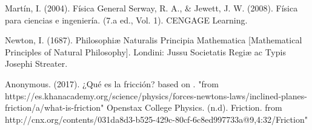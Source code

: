 \documentclass{article}
\begin{document}
\begin{thebibliography}{9}						%
		Martín, I. (2004). Física General
		Serway, R. A., $\&$ Jewett, J. W. (2008). Física para ciencias e ingeniería. (7.a
ed., Vol. 1). CENGAGE Learning.

	Newton, I. (1687). Philosophiæ Naturalis Principia Mathematica [Mathematical Principles of Natural Philosophy]. Londini: Jussu Societatis Regiæ ac Typis Josephi Streater.

	Anonymous. (2017). ¿Qué es la fricción? based on \cite{Openstax College Physics}. "from https://es.khanacademy.org/science/physics/forces-newtons-laws/inclined-planes-friction/a/what-is-friction"
		Openstax College Physics. (n.d). Friction. from http://cnx.org/contents/031da8d3-b525-429c-80cf-6c8ed997733a@9,4:32/Friction"

\end{thebibliography}
\end{document}
